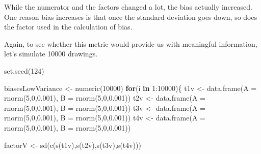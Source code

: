 \documentclass[
  10pt,
  dvipsnames,enabledeprecatedfontcommands]{scrartcl}
\newenvironment{Shaded}{\begin{snugshade}}{\end{snugshade}}
\newcommand{\AttributeTok}[1]{\textcolor[rgb]{0.77,0.63,0.00}{#1}}
\newcommand{\ControlFlowTok}[1]{\textcolor[rgb]{0.13,0.29,0.53}{\textbf{#1}}}
\newcommand{\DecValTok}[1]{\textcolor[rgb]{0.00,0.00,0.81}{#1}}
\newcommand{\FloatTok}[1]{\textcolor[rgb]{0.00,0.00,0.81}{#1}}
\newcommand{\FunctionTok}[1]{\textcolor[rgb]{0.00,0.00,0.00}{#1}}
\newcommand{\NormalTok}[1]{#1}
\newcommand{\OtherTok}[1]{\textcolor[rgb]{0.56,0.35,0.01}{#1}}
\newcommand{\SpecialCharTok}[1]{\textcolor[rgb]{0.00,0.00,0.00}{#1}}
\begin{document}
\normalsize

While the numerator and the factors changed a lot, the bias actually
increased. One reason bias increases is that once the standard deviation
goes down, so does the factor used in the calculation of bias.

Again, to see whether this metric would provide us with meaningful
information, let's simulate 10000 drawings.

\vspace{1mm}
\footnotesize

\begin{Shaded}
\begin{Highlighting}[]
\FunctionTok{set.seed}\NormalTok{(}\DecValTok{124}\NormalTok{)}

\NormalTok{biasesLowVariance }\OtherTok{\textless{}{-}} \FunctionTok{numeric}\NormalTok{(}\DecValTok{10000}\NormalTok{)}
\ControlFlowTok{for}\NormalTok{(i }\ControlFlowTok{in} \DecValTok{1}\SpecialCharTok{:}\DecValTok{10000}\NormalTok{)\{}
\NormalTok{t1v }\OtherTok{\textless{}{-}} \FunctionTok{data.frame}\NormalTok{(}\AttributeTok{A  =} \FunctionTok{rnorm}\NormalTok{(}\DecValTok{5}\NormalTok{,}\DecValTok{0}\NormalTok{,}\FloatTok{0.001}\NormalTok{), }\AttributeTok{B =} \FunctionTok{rnorm}\NormalTok{(}\DecValTok{5}\NormalTok{,}\DecValTok{0}\NormalTok{,}\FloatTok{0.001}\NormalTok{))}
\NormalTok{t2v }\OtherTok{\textless{}{-}} \FunctionTok{data.frame}\NormalTok{(}\AttributeTok{A  =} \FunctionTok{rnorm}\NormalTok{(}\DecValTok{5}\NormalTok{,}\DecValTok{0}\NormalTok{,}\FloatTok{0.001}\NormalTok{), }\AttributeTok{B =} \FunctionTok{rnorm}\NormalTok{(}\DecValTok{5}\NormalTok{,}\DecValTok{0}\NormalTok{,}\FloatTok{0.001}\NormalTok{))}
\NormalTok{t3v }\OtherTok{\textless{}{-}} \FunctionTok{data.frame}\NormalTok{(}\AttributeTok{A  =} \FunctionTok{rnorm}\NormalTok{(}\DecValTok{5}\NormalTok{,}\DecValTok{0}\NormalTok{,}\FloatTok{0.001}\NormalTok{), }\AttributeTok{B =} \FunctionTok{rnorm}\NormalTok{(}\DecValTok{5}\NormalTok{,}\DecValTok{0}\NormalTok{,}\FloatTok{0.001}\NormalTok{))}
\NormalTok{t4v }\OtherTok{\textless{}{-}} \FunctionTok{data.frame}\NormalTok{(}\AttributeTok{A  =} \FunctionTok{rnorm}\NormalTok{(}\DecValTok{5}\NormalTok{,}\DecValTok{0}\NormalTok{,}\FloatTok{0.001}\NormalTok{), }\AttributeTok{B =} \FunctionTok{rnorm}\NormalTok{(}\DecValTok{5}\NormalTok{,}\DecValTok{0}\NormalTok{,}\FloatTok{0.001}\NormalTok{))}

\NormalTok{factorV }\OtherTok{\textless{}{-}} \FunctionTok{sd}\NormalTok{(}\FunctionTok{c}\NormalTok{(}\FunctionTok{s}\NormalTok{(t1v),}\FunctionTok{s}\NormalTok{(t2v),}\FunctionTok{s}\NormalTok{(t3v),}\FunctionTok{s}\NormalTok{(t4v)))}


\end{Highlighting}
\end{Shaded}
\end{document}
